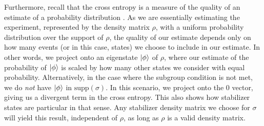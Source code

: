 
Furthermore, recall that the cross entropy is a measure of the quality of an estimate of a
probability distribution \cite{coverElementsInformationTheory2006}. As we are
essentially estimating the experiment, represented by the density matrix
$\rho$, with a uniform probability distribution over the support of $\rho$, the
quality of our estimate depends only on how many events (or in this case,
states) we choose to include in our estimate. In other words, we project onto
an eigenstate $\ket{\phi}$ of $\rho$, where our estimate of the probability of
$\ket{\phi}$ is scaled by how many other states we consider with equal
probability. Alternatively, in the case where the subgroup condition is not
met, we do \emph{not} have $\ket{\phi}$ in $\mathrm{supp}\left( \sigma
\right)$. In this scenario, we project onto the $0$ vector, giving us a
divergent term in the cross entropy.
This also shows how stabilizer
states are particular in that sense. Any stabilizer density matrix we choose
for $\sigma$ will yield this result, independent of $\rho$, as long as $\rho$
is a valid density matrix. 

